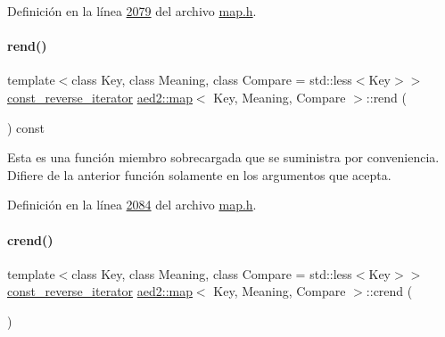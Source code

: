 Definición en la línea \hyperlink{map_8h_source_l02079}{2079} del archivo \hyperlink{map_8h_source}{map.\+h}.

\mbox{\label{classaed2_1_1map_a7cf14a4b505505d0f074034b7399fb24_a7cf14a4b505505d0f074034b7399fb24}} 
\paragraph{\texorpdfstring{rend()}{rend()}\hspace{0.1cm}{\footnotesize\ttfamily [2/2]}}
{\footnotesize\ttfamily template$<$class Key, class Meaning, class Compare = std\+::less$<$\+Key$>$$>$ \\
\hyperlink{classaed2_1_1map_aed66a216549d13078a3ea6978ea0b768_aed66a216549d13078a3ea6978ea0b768}{const\+\_\+reverse\+\_\+iterator} \hyperlink{classaed2_1_1map}{aed2\+::map}$<$ Key, Meaning, Compare $>$\+::rend (\begin{DoxyParamCaption}{ }\end{DoxyParamCaption}) const\hspace{0.3cm}{\ttfamily [inline]}}

Esta es una función miembro sobrecargada que se suministra por conveniencia. Difiere de la anterior función solamente en los argumentos que acepta. 

Definición en la línea \hyperlink{map_8h_source_l02084}{2084} del archivo \hyperlink{map_8h_source}{map.\+h}.

\mbox{\label{classaed2_1_1map_a40933b2efe1cb479de9195ea947244d1_a40933b2efe1cb479de9195ea947244d1}} 
\paragraph{\texorpdfstring{crend()}{crend()}}
{\footnotesize\ttfamily template$<$class Key, class Meaning, class Compare = std\+::less$<$\+Key$>$$>$ \\
\hyperlink{classaed2_1_1map_aed66a216549d13078a3ea6978ea0b768_aed66a216549d13078a3ea6978ea0b768}{const\+\_\+reverse\+\_\+iterator} \hyperlink{classaed2_1_1map}{aed2\+::map}$<$ Key, Meaning, Compare $>$\+::crend (\begin{DoxyParamCaption}{ }\end{DoxyParamCaption})\hspace{0.3cm}{\ttfamily [inline]}}

